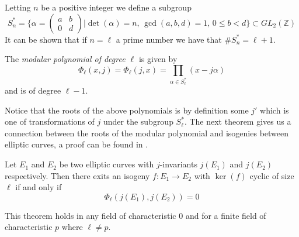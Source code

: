 Letting $n$ be a positive integer we define a subgroup
$$ S_n^* = \{ \alpha = \begin{pmatrix} a & b \\ 0 & d \end{pmatrix} | \det(\alpha)=n,\, \gcd(a,b,d)=1,\, 0 \leq b < d \} \subset GL_2(\mathbb{Z}) $$
It can be shown that if $n = \ell$ a prime number we have that $\#S_n^* = \ell + 1$.

\begin{mydef}
 The \emph{modular polynomial of degree $\ell$} is given by
$$\Phi_\ell(x,j) = \Phi_\ell(j,x) = \prod_{\alpha \in S_\ell^*}(x - j \alpha) $$
and is of degree $\ell-1$.
\end{mydef}
Notice that the roots of the above polynomials is by definition some $j'$ which is one of transformations
of $j$ under the subgroup $S_\ell^*$. The next theorem gives us a connection between the roots of the
modular polynomial and isogenies between elliptic curves, a proof can be found in \cite{Lang2}.

\begin{thm} \label{modpol}
 Let $E_1$ and $E_2$ be two elliptic curves with $j$-invariants $j(E_1)$ and $j(E_2)$ respectively.
Then there exits an isogeny $f: E_1 \rightarrow E_2$ with $\ker(f)$ cyclic of size $\ell$ if and only if
$$\Phi_\ell(j(E_1), j(E_2)) = 0 $$
\end{thm}

This theorem holds in any field of characteristic $0$ and for a finite field of characteristic $p$ where
$\ell \neq p$.

